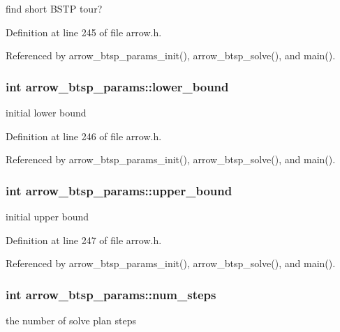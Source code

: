 find short BSTP tour? 

Definition at line 245 of file arrow.h.

Referenced by arrow\_\-btsp\_\-params\_\-init(), arrow\_\-btsp\_\-solve(), and main().\hypertarget{structarrow__btsp__params_da747e3797f9327834e4dbb1459d2786}{
\subsubsection{\setlength{\rightskip}{0pt plus 5cm}int {\bf arrow\_\-btsp\_\-params::lower\_\-bound}}}
\label{structarrow__btsp__params_da747e3797f9327834e4dbb1459d2786}


initial lower bound 

Definition at line 246 of file arrow.h.

Referenced by arrow\_\-btsp\_\-params\_\-init(), arrow\_\-btsp\_\-solve(), and main().\hypertarget{structarrow__btsp__params_b8749004215015a78139b8e4e1fb8905}{
\subsubsection{\setlength{\rightskip}{0pt plus 5cm}int {\bf arrow\_\-btsp\_\-params::upper\_\-bound}}}
\label{structarrow__btsp__params_b8749004215015a78139b8e4e1fb8905}


initial upper bound 

Definition at line 247 of file arrow.h.

Referenced by arrow\_\-btsp\_\-params\_\-init(), arrow\_\-btsp\_\-solve(), and main().\hypertarget{structarrow__btsp__params_2897d24f2fdd53c723609cf68880f55e}{
\subsubsection{\setlength{\rightskip}{0pt plus 5cm}int {\bf arrow\_\-btsp\_\-params::num\_\-steps}}}
\label{structarrow__btsp__params_2897d24f2fdd53c723609cf68880f55e}


the number of solve plan steps 

